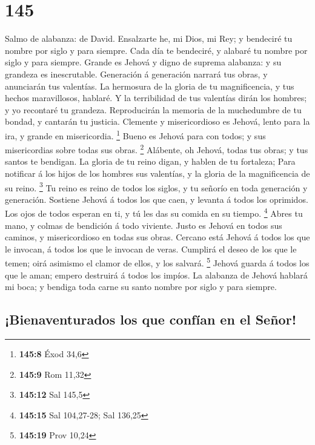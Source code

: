 \hypertarget{section-144}{%
\section{145}\label{section-144}}

 Salmo de alabanza: de David. Ensalzarte he, mi Dios, mi
Rey; y bendeciré tu nombre por siglo y para siempre.  Cada
día te bendeciré, y alabaré tu nombre por siglo y para siempre.
 Grande es Jehová y digno de suprema alabanza: y su grandeza
es inescrutable.  Generación á generación narrará tus obras,
y anunciarán tus valentías.  La hermosura de la gloria de tu
magnificencia, y tus hechos maravillosos, hablaré.  Y la
terribilidad de tus valentías dirán los hombres; y yo recontaré tu
grandeza.  Reproducirán la memoria de la muchedumbre de tu
bondad, y cantarán tu justicia.  Clemente y misericordioso
es Jehová, lento para la ira, y grande en misericordia. \footnote{\textbf{145:8}
  Éxod 34,6}  Bueno es Jehová para con todos; y sus
misericordias sobre todas sus obras. \footnote{\textbf{145:9} Rom 11,32}
 Alábente, oh Jehová, todas tus obras; y tus santos te
bendigan.  La gloria de tu reino digan, y hablen de tu
fortaleza;  Para notificar á los hijos de los hombres sus
valentías, y la gloria de la magnificencia de su reino. \footnote{\textbf{145:12}
  Sal 145,5}  Tu reino es reino de todos los siglos, y tu
señorío en toda generación y generación.  Sostiene Jehová á
todos los que caen, y levanta á todos los oprimidos.  Los
ojos de todos esperan en ti, y tú les das su comida en su tiempo.
\footnote{\textbf{145:15} Sal 104,27-28; Sal 136,25}  Abres
tu mano, y colmas de bendición á todo viviente.  Justo es
Jehová en todos sus caminos, y misericordioso en todas sus obras.
 Cercano está Jehová á todos los que le invocan, á todos
los que le invocan de veras.  Cumplirá el deseo de los que
le temen; oirá asimismo el clamor de ellos, y los salvará. \footnote{\textbf{145:19}
  Prov 10,24}  Jehová guarda á todos los que le aman;
empero destruirá á todos los impíos.  La alabanza de Jehová
hablará mi boca; y bendiga toda carne su santo nombre por siglo y para
siempre.

\hypertarget{bienaventurados-los-que-confuxedan-en-el-seuxf1or}{%
\subsection{¡Bienaventurados los que confían en el
Señor!}\label{bienaventurados-los-que-confuxedan-en-el-seuxf1or}}

